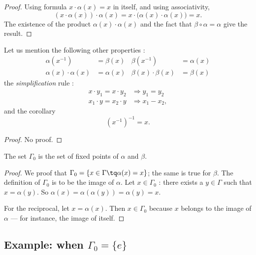 \begin{proof}
Using formula $x\cdot\alpha(x)=x$ in itself, and using associativity,
\[ 
  (x\cdot\alpha(x))\cdot\alpha(x)=x\cdot\big( \alpha(x)\cdot\alpha(x) \big)=x.
\]
The existence of the product $\alpha(x)\cdot\alpha(x)$ and the fact that $\beta\circ\alpha=\alpha$ give the result.
\end{proof}

\begin{lemma}
Let us mention the following other properties :
\begin{align}
\alpha(x^{-1})&=\beta(x)&\beta(x^{-1})&=\alpha(x)\\
\alpha(x)\cdot\alpha(x)&=\alpha(x)&\beta(x)\cdot\beta(x)&=\beta(x)
\end{align}
the \emph{simplification} rule :
\begin{align}
x\cdot y_{1}=x\cdot y_{2}&\Rightarrow y_{1}=y_{2}\\
x_1\cdot y=x_{2}\cdot y&\Rightarrow x_1-x_2,
\end{align}
and the corollary
\begin{equation}
(x^{-1})^{-1}=x.
\end{equation}

\end{lemma}
\begin{proof}
No proof.
\end{proof}

\begin{proposition}
The set $\Gamma_0$ is the set of fixed points of $\alpha$ and $\beta$.
\end{proposition}

\begin{proof}
We proof that $\Gamma_0=\{ x\in\Gamma\tq \alpha(x)=x \}$; the same is true for $\beta$. The definition of $\Gamma_0$ is to be the image of $\alpha$. Let $x\in\Gamma_0$ : there exists a $y\in\Gamma$ such that $x=\alpha(y)$. So $\alpha(x)=\alpha(\alpha(y))=\alpha(y)=x$.

For the reciprocal, let $x=\alpha(x)$. Then $x\in \Gamma_0$ because $x$ belongs to the image of $\alpha$ --- for instance, the image of itself.
\end{proof}

\subsection{Example: when \texorpdfstring{$\Gamma_0=\{ e \}$ }{G=e}}


